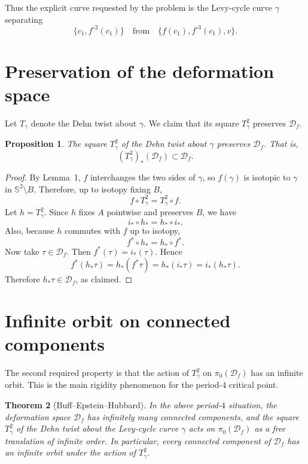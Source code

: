 \documentclass[11pt]{amsart}
\newtheorem{theorem}{Theorem}
\newtheorem{proposition}[theorem]{Proposition}
\theoremstyle{definition}
\theoremstyle{remark}
\begin{document}
Thus the explicit curve requested by the problem is the Levy-cycle curve
\(\gamma\) separating
\[
\{c_1,f^{\circ 2}(c_1)\}
\quad\text{from}\quad
\{f(c_1),f^{\circ 3}(c_1),v\}.
\]

\section{Preservation of the deformation space}

Let \(T_\gamma\) denote the Dehn twist about \(\gamma\).  We claim that its
square \(T_\gamma^2\) preserves \(\mathcal D_f\).

\begin{proposition}
The square \(T_\gamma^2\) of the Dehn twist about \(\gamma\) preserves
\(\mathcal D_f\).  That is,
\[
(T_\gamma^2)_*(\mathcal D_f)\subset \mathcal D_f.
\]
\end{proposition}

\begin{proof}
By Lemma~1, \(f\) interchanges the two sides of \(\gamma\), so \(f(\gamma)\)
is isotopic to \(\gamma\) in \(\mathbb S^2\setminus B\).  Therefore, up to
isotopy fixing \(B\),
\[
f\circ T_\gamma^2=T_\gamma^2\circ f.
\]
Let \(h=T_\gamma^2\).  Since \(h\) fixes \(A\) pointwise and preserves \(B\),
we have
\[
i_*\circ h_* = h_*\circ i_*.
\]
Also, because \(h\) commutes with \(f\) up to isotopy,
\[
f^*\circ h_* = h_*\circ f^*.
\]
Now take \(\tau\in\mathcal D_f\).  Then \(f^*(\tau)=i_*(\tau)\).  Hence
\[
f^*(h_*\tau)
= h_*(f^*\tau)
= h_*(i_*\tau)
= i_*(h_*\tau).
\]
Therefore \(h_*\tau\in\mathcal D_f\), as claimed.
\end{proof}

\section{Infinite orbit on connected components}

The second required property is that the action of \(T_\gamma^2\) on
\(\pi_0(\mathcal D_f)\) has an infinite orbit.  This is the main rigidity
phenomenon for the period-\(4\) critical point.

\begin{theorem}[Buff--Epstein--Hubbard]
In the above period-\(4\) situation, the deformation space
\(\mathcal D_f\) has infinitely many connected components, and the square
\(T_\gamma^2\) of the Dehn twist about the Levy-cycle curve \(\gamma\)
acts on \(\pi_0(\mathcal D_f)\) as a free translation of infinite order.
In particular, every connected component of \(\mathcal D_f\) has an
infinite orbit under the action of \(T_\gamma^2\).
\end{theorem}
\end{document}
